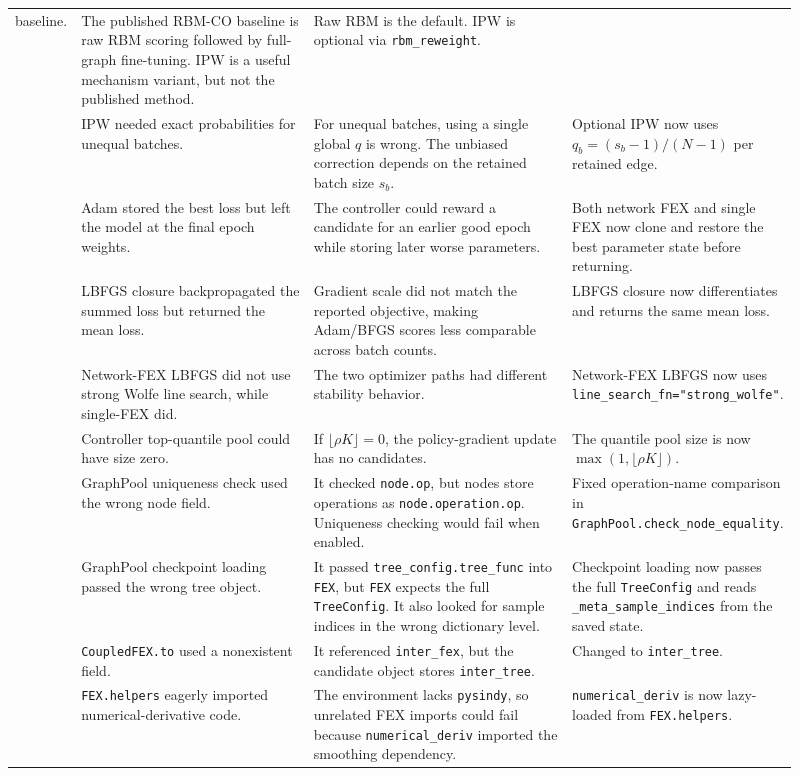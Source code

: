 \documentclass[11pt]{article}
\begin{document}
\begin{longtable}{p{0.04\linewidth} p{0.31\linewidth} p{0.34\linewidth} p{0.22\linewidth}}
baseline. &
The published RBM-CO baseline is raw RBM scoring followed by full-graph
fine-tuning.  IPW is a useful mechanism variant, but not the published method. &
Raw RBM is the default.  IPW is optional via \verb|rbm_reweight|. \\
\addlinespace
7 &
IPW needed exact probabilities for unequal batches. &
For unequal batches, using a single global $q$ is wrong.  The unbiased
correction depends on the retained batch size $s_b$. &
Optional IPW now uses $q_b=(s_b-1)/(N-1)$ per retained edge. \\
\addlinespace
8 &
Adam stored the best loss but left the model at the final epoch weights. &
The controller could reward a candidate for an earlier good epoch while
storing later worse parameters. &
Both network FEX and single FEX now clone and restore the best parameter state
before returning. \\
\addlinespace
9 &
LBFGS closure backpropagated the summed loss but returned the mean loss. &
Gradient scale did not match the reported objective, making Adam/BFGS scores
less comparable across batch counts. &
LBFGS closure now differentiates and returns the same mean loss. \\
\addlinespace
10 &
Network-FEX LBFGS did not use strong Wolfe line search, while single-FEX did. &
The two optimizer paths had different stability behavior. &
Network-FEX LBFGS now uses \verb|line_search_fn="strong_wolfe"|. \\
\addlinespace
11 &
Controller top-quantile pool could have size zero. &
If $\lfloor \rho K\rfloor=0$, the policy-gradient update has no candidates. &
The quantile pool size is now $\max(1,\lfloor \rho K\rfloor)$. \\
\addlinespace
12 &
GraphPool uniqueness check used the wrong node field. &
It checked \verb|node.op|, but nodes store operations as
\verb|node.operation.op|.  Uniqueness checking would fail when enabled. &
Fixed operation-name comparison in \verb|GraphPool.check_node_equality|. \\
\addlinespace
13 &
GraphPool checkpoint loading passed the wrong tree object. &
It passed \verb|tree_config.tree_func| into \verb|FEX|, but \verb|FEX| expects
the full \verb|TreeConfig|.  It also looked for sample indices in the wrong
dictionary level. &
Checkpoint loading now passes the full \verb|TreeConfig| and reads
\verb|_meta_sample_indices| from the saved state. \\
\addlinespace
14 &
\verb|CoupledFEX.to| used a nonexistent field. &
It referenced \verb|inter_fex|, but the candidate object stores
\verb|inter_tree|. &
Changed to \verb|inter_tree|. \\
\addlinespace
15 &
\verb|FEX.helpers| eagerly imported numerical-derivative code. &
The environment lacks \verb|pysindy|, so unrelated FEX imports could fail
because \verb|numerical_deriv| imported the smoothing dependency. &
\verb|numerical_deriv| is now lazy-loaded from \verb|FEX.helpers|. \\
\bottomrule
\end{longtable}
\end{document}
